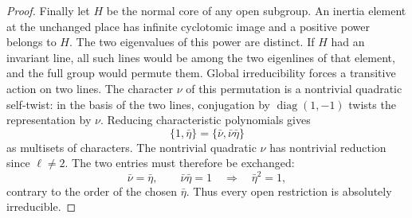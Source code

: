 \begin{proof}
Finally let \(H\) be the normal core of any open subgroup.
An inertia element at the unchanged place has infinite
cyclotomic image and a positive power belongs to \(H\).
The two eigenvalues of this power are distinct. If \(H\)
had an invariant line, all such lines would be among
the two eigenlines of that element, and the full group
would permute them. Global irreducibility forces a
transitive action on two lines. The character \(\nu\)
of this permutation is a nontrivial quadratic self-twist:
in the basis of the two lines, conjugation by
\(\operatorname{diag}(1,-1)\) twists the representation by
\(\nu\). Reducing characteristic polynomials gives
\[
 \{1,\bar\eta\}=\{\bar\nu,\bar\nu\bar\eta\}
\]
as
multisets of characters. The nontrivial quadratic \(\nu\) has nontrivial reduction since \(\ell\ne2\). The two entries must therefore be exchanged:
\[
 \bar\nu=\bar\eta,\qquad \bar\nu\bar\eta=1
 \quad\Longrightarrow\quad\bar\eta^2=1,
\]
contrary to the order of the chosen \(\bar\eta\). Thus every open restriction
is absolutely irreducible.
\end{proof}
